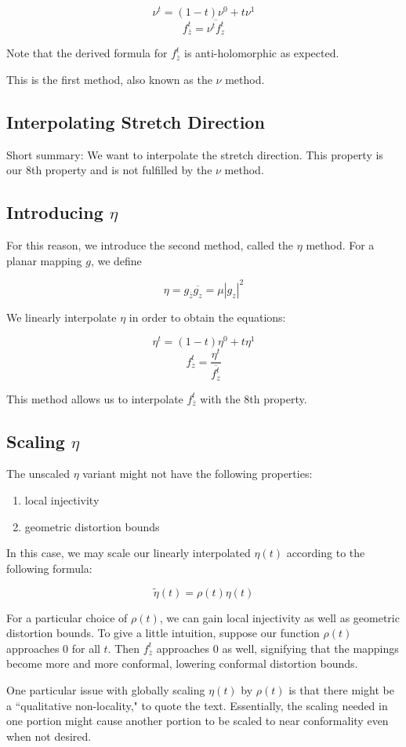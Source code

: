 $$\nu^t = (1-t) \nu^0 + t \nu^1$$
$$f_{\overline{z}}^t = \overline{\nu^t f_z^t}$$

Note that the derived formula for $f_{\overline{z}}^t$ is anti-holomorphic as expected.

This is the first method, also known as the $\nu$ method.

\subsection{Interpolating Stretch Direction}

Short summary: We want to interpolate the stretch direction. This property is our 8th property and is not fulfilled by the $\nu$ method.

\subsection{Introducing $\eta$}

For this reason, we introduce the second method, called the $\eta$ method. For a planar mapping $g$, we define 

$$ \eta = g_{\overline{z}} \overline{g_z} = \mu |g_z|^2 $$

We linearly interpolate $\eta$ in order to obtain the equations:

$$\eta^t = (1-t) \eta^0 + t \eta^1$$
$$f_{\overline{z}}^t = \frac{\eta^t}{ \overline{f_z^t} }$$

This method allows us to interpolate $f_{\overline{z}}^t$ with the 8th property. 




\subsection{Scaling $\eta$}

The unscaled $\eta$ variant might not have the following properties:

\begin{enumerate}
	\item local injectivity
	\item geometric distortion bounds %
\end{enumerate}

In this case, we may scale our linearly interpolated $\eta(t)$ according to the following formula:

$$\widetilde{\eta}(t) = \rho(t) \eta(t)$$

For a particular choice of $\rho(t)$, we can gain local injectivity as well as geometric distortion bounds. To give a little intuition, suppose our function $\rho(t)$ approaches $0$ for all $t$. Then $f_{\overline{z}}^t$ approaches $0$ as well, signifying that the mappings become more and more conformal, lowering conformal distortion bounds.

One particular issue with globally scaling $\eta(t)$ by $\rho(t)$ is that there might be a ``qualitative non-locality," to quote the text. Essentially, the scaling needed in one portion might cause another portion to be scaled to near conformality even when not desired.





